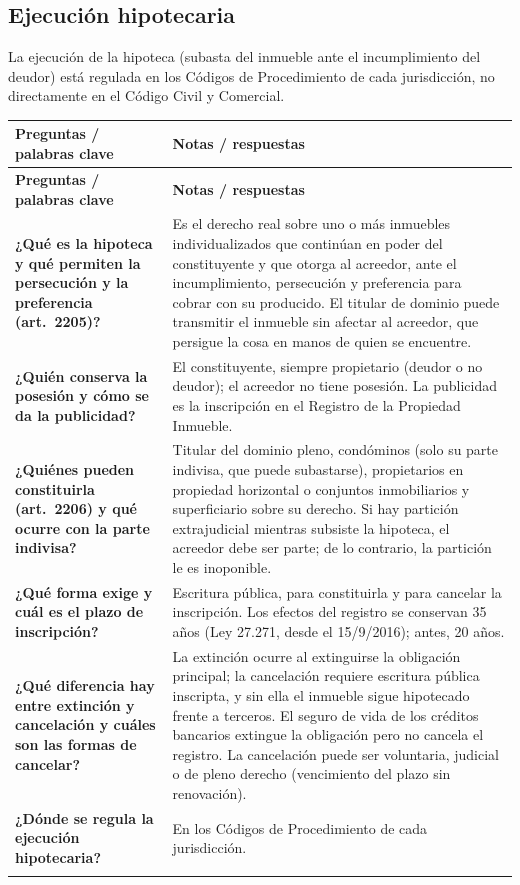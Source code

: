 \documentclass[12pt,oneside]{book}
\makeatletter
\renewcommand{\arraystretch}{1.25}
\newcommand{\cq}[2]{\textbf{#1} & #2 \\[0.45em]}
\newcommand{\cornell}[3]{%
\par\bigskip\noindent{\large\bfseries Cuadro Cornell: #1}\par\nopagebreak\smallskip
\begingroup
\small
\renewcommand{\arraystretch}{1.15}
\begin{longtable}{@{}>{\raggedright\arraybackslash}p{0.26\textwidth}>{\raggedright\arraybackslash}p{0.66\textwidth}@{}}
\toprule
\textbf{Preguntas / palabras clave} & \textbf{Notas / respuestas} \\
\midrule
\endfirsthead
\toprule
\textbf{Preguntas / palabras clave} & \textbf{Notas / respuestas} \\
\midrule
\endhead
#2
\midrule
\multicolumn{2}{@{}p{\dimexpr0.92\textwidth+2\tabcolsep\relax}@{}}{\vspace{0.2em}\textbf{Resumen.} #3\vspace{0.2em}} \\
\bottomrule
\end{longtable}
\endgroup
}
\makeatother
\begin{document}
\subsection{Ejecución hipotecaria}

La ejecución de la hipoteca (subasta del inmueble ante el incumplimiento del deudor) está regulada en los Códigos de Procedimiento de cada jurisdicción, no directamente en el Código Civil y Comercial.

\cornell{hipoteca}{
\cq{¿Qué es la hipoteca y qué permiten la persecución y la preferencia (art.~2205)?}{Es el derecho real sobre uno o más inmuebles individualizados que continúan en poder del constituyente y que otorga al acreedor, ante el incumplimiento, persecución y preferencia para cobrar con su producido. El titular de dominio puede transmitir el inmueble sin afectar al acreedor, que persigue la cosa en manos de quien se encuentre.}
\cq{¿Quién conserva la posesión y cómo se da la publicidad?}{El constituyente, siempre propietario (deudor o no deudor); el acreedor no tiene posesión. La publicidad es la inscripción en el Registro de la Propiedad Inmueble.}
\cq{¿Quiénes pueden constituirla (art.~2206) y qué ocurre con la parte indivisa?}{Titular del dominio pleno, condóminos (solo su parte indivisa, que puede subastarse), propietarios en propiedad horizontal o conjuntos inmobiliarios y superficiario sobre su derecho. Si hay partición extrajudicial mientras subsiste la hipoteca, el acreedor debe ser parte; de lo contrario, la partición le es inoponible.}
\cq{¿Qué forma exige y cuál es el plazo de inscripción?}{Escritura pública, para constituirla y para cancelar la inscripción. Los efectos del registro se conservan 35 años (Ley 27.271, desde el 15/9/2016); antes, 20 años.}
\cq{¿Qué diferencia hay entre extinción y cancelación y cuáles son las formas de cancelar?}{La extinción ocurre al extinguirse la obligación principal; la cancelación requiere escritura pública inscripta, y sin ella el inmueble sigue hipotecado frente a terceros. El seguro de vida de los créditos bancarios extingue la obligación pero no cancela el registro. La cancelación puede ser voluntaria, judicial o de pleno derecho (vencimiento del plazo sin renovación).}
\cq{¿Dónde se regula la ejecución hipotecaria?}{En los Códigos de Procedimiento de cada jurisdicción.}
}{La hipoteca opera sobre inmuebles sin desplazamiento posesorio, otorga persecución y preferencia y da publicidad a través del Registro de la Propiedad Inmueble. Se constituye por escritura pública, sus efectos registrales se conservan por 35 años y debe distinguirse la extinción de la cancelación, pues la primera no implica automáticamente la segunda.}
\end{document}
